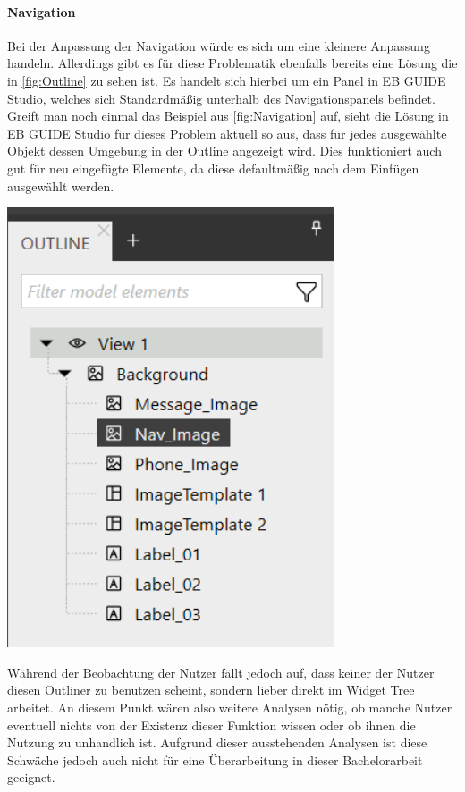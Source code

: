\paragraph{Navigation}
Bei der Anpassung der Navigation würde es sich um eine kleinere Anpassung handeln.
Allerdings gibt es für diese Problematik ebenfalls bereits eine Lösung die in \cref{fig:Outline} zu sehen ist.
Es handelt sich hierbei um ein Panel in EB GUIDE Studio, welches sich Standardmäßig unterhalb des Navigationspanels befindet.
Greift man noch einmal das Beispiel aus \cref{fig:Navigation} auf, sieht die Lösung in EB GUIDE Studio für dieses Problem aktuell so aus, dass für jedes ausgewählte Objekt dessen Umgebung in der Outline angezeigt wird.
Dies funktioniert auch gut für neu eingefügte Elemente, da diese defaultmäßig nach dem Einfügen ausgewählt werden.

\begin{center}
  \includegraphics[scale=0.6]{figures/Outline.png}
  \label{fig:Outline}
\end{center}

Während der Beobachtung der Nutzer fällt jedoch auf, dass keiner der Nutzer diesen Outliner zu benutzen scheint, sondern lieber direkt im Widget Tree arbeitet.
An diesem Punkt wären also weitere Analysen nötig, ob manche Nutzer eventuell nichts von der Existenz dieser Funktion wissen oder ob ihnen die Nutzung zu unhandlich ist.
Aufgrund dieser ausstehenden Analysen ist diese Schwäche jedoch auch nicht für eine Überarbeitung in dieser Bachelorarbeit geeignet.

